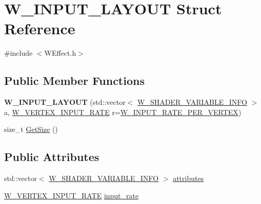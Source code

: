 \hypertarget{struct_w___i_n_p_u_t___l_a_y_o_u_t}{}\section{W\+\_\+\+I\+N\+P\+U\+T\+\_\+\+L\+A\+Y\+O\+UT Struct Reference}
\label{struct_w___i_n_p_u_t___l_a_y_o_u_t}


{\ttfamily \#include $<$W\+Effect.\+h$>$}

\subsection*{Public Member Functions}
\begin{DoxyCompactItemize}
\item 
{\bfseries W\+\_\+\+I\+N\+P\+U\+T\+\_\+\+L\+A\+Y\+O\+UT} (std\+::vector$<$ \hyperlink{struct_w___s_h_a_d_e_r___v_a_r_i_a_b_l_e___i_n_f_o}{W\+\_\+\+S\+H\+A\+D\+E\+R\+\_\+\+V\+A\+R\+I\+A\+B\+L\+E\+\_\+\+I\+N\+FO} $>$ a, \hyperlink{group__engineclass_gad9e5fe1880687bc445eec4c141324116}{W\+\_\+\+V\+E\+R\+T\+E\+X\+\_\+\+I\+N\+P\+U\+T\+\_\+\+R\+A\+TE} r=\hyperlink{group__engineclass_ggad9e5fe1880687bc445eec4c141324116a6fca29ea21ed48a0deedb03a85b32b4d}{W\+\_\+\+I\+N\+P\+U\+T\+\_\+\+R\+A\+T\+E\+\_\+\+P\+E\+R\+\_\+\+V\+E\+R\+T\+EX})\hypertarget{struct_w___i_n_p_u_t___l_a_y_o_u_t_a7170e52b6b28b27eb67e0a2d790b6cf2}{}\label{struct_w___i_n_p_u_t___l_a_y_o_u_t_a7170e52b6b28b27eb67e0a2d790b6cf2}

\item 
size\+\_\+t \hyperlink{struct_w___i_n_p_u_t___l_a_y_o_u_t_ad2f73e39a5198e328903616f627b313f}{Get\+Size} ()
\end{DoxyCompactItemize}
\subsection*{Public Attributes}
\begin{DoxyCompactItemize}
\item 
std\+::vector$<$ \hyperlink{struct_w___s_h_a_d_e_r___v_a_r_i_a_b_l_e___i_n_f_o}{W\+\_\+\+S\+H\+A\+D\+E\+R\+\_\+\+V\+A\+R\+I\+A\+B\+L\+E\+\_\+\+I\+N\+FO} $>$ \hyperlink{struct_w___i_n_p_u_t___l_a_y_o_u_t_aab71e215609c4b3a7c23e87fffdcb65e}{attributes}
\item 
\hyperlink{group__engineclass_gad9e5fe1880687bc445eec4c141324116}{W\+\_\+\+V\+E\+R\+T\+E\+X\+\_\+\+I\+N\+P\+U\+T\+\_\+\+R\+A\+TE} \hyperlink{struct_w___i_n_p_u_t___l_a_y_o_u_t_aa02f513ac0db3cbb549d4f5a48bb9fef}{input\+\_\+rate}
\end{DoxyCompactItemize}


